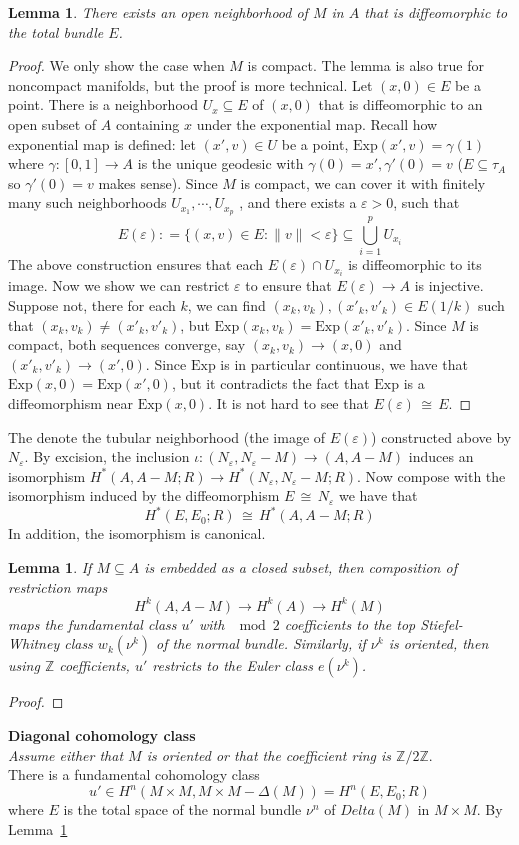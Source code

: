 \documentclass[12pt]{article}
\theoremstyle{plain}
\newtheorem{lemma}[equation]{Lemma}
\theoremstyle{definition}
\newcommand{\IZ}{\mathbb{Z}}
\newcommand\iso{\,{\cong}\,}
\newcommand\union{\bigcup}
\newcommand{\<}{\langle}
\renewcommand{\>}{\rangle}
\newcommand{\Exp}{\mathrm{Exp}}
\newcommand{\sm}{\varepsilon}
\begin{document}
\begin{lemma}
There exists an open neighborhood of $M$ in $A$ that is diffeomorphic to the total bundle $E$. 
\end{lemma}
\begin{proof}
We only show the case when $M$ is compact. The lemma is also true for noncompact manifolds, but the proof is more technical. Let $(x, 0) \in E$ be a point. There is a neighborhood $U_x \subseteq E$ of $(x, 0)$ that is diffeomorphic to an open subset of $A$ containing $x$ under the exponential map. Recall how exponential map is defined: let $(x', v) \in U$ be a point, $\Exp(x', v) = \gamma(1)$ where $\gamma : [0, 1] \to A$ is the unique geodesic with $\gamma(0) = x', \gamma'(0) = v$ ($E \subseteq \tau_A$ so $\gamma'(0) = v$ makes sense). Since $M$ is compact, we can cover it with finitely many such neighborhoods $U_{x_1}, \cdots, U_{x_p}$ , and there exists a $\sm >0 $, such that 
$$ E(\sm) : = \{(x, v) \in E : \| v\| < \sm \} \subseteq \union_{i = 1}^p U_{x_i}$$ 
The above construction ensures that each $E(\sm) \cap U_{x_i}$ is diffeomorphic to its image. Now we show we can restrict $\sm$ to ensure that $E(\sm) \to A$ is injective. Suppose not, there for each $k$, we can find $(x_k, v_k), (x'_k, v'_k) \in E(1/k)$ such that $(x_k, v_k) \neq (x'_k, v'_k)$, but $\Exp(x_k, v_k) = \Exp(x'_k, v'_k)$. Since $M$ is compact, both sequences converge, say $(x_k, v_k) \to (x, 0)$ and $(x'_k, v'_k) \to (x', 0)$. Since $\Exp$ is in particular continuous, we have that $\Exp(x, 0) = \Exp(x', 0)$, but it contradicts the fact that $\Exp$ is a diffeomorphism near $\Exp(x, 0)$. It is not hard to see that $E(\sm) \iso E$. 
\end{proof}
The denote the tubular neighborhood (the image of $E(\sm)$) constructed above by $N_\sm$. By excision, the inclusion $\iota : (N_\sm, N_\sm - M) \to (A, A - M)$ induces an isomorphism $H^*(A, A - M; R) \to H^*(N_\sm, N_\sm - M; R)$. Now compose with the isomorphism induced by the diffeomorphism $E \iso N_\sm$ we have that 
$$ H^*(E, E_0; R) \iso H^*(A, A - M; R) $$
In addition, the isomorphism is canonical.
\begin{lemma}
\label{normaltofund}
If $M \subseteq A$ is embedded as a closed subset, then composition of restriction maps 
$$ H^k(A, A - M) \to H^k(A) \to H^k(M)$$
maps the fundamental class $u'$ with $\mod 2$ coefficients to the top Stiefel-Whitney class $w_k(\nu^k)$ of the normal bundle. Similarly, if $\nu^k$ is oriented, then using $\IZ$ coefficients, $u'$ restricts to the Euler class $e(\nu^k)$. 
\end{lemma}
\begin{proof}

\end{proof}
\textbf{Diagonal cohomology class}\\
\textit{Assume either that $M$ is oriented or that the coefficient ring is $\IZ/2\IZ$}.\\
There is a fundamental cohomology class 
$$ u' \in H^n(M \times M, M \times M - \Delta(M)) = H^n(E, E_0; R)$$
where $E$ is the total space of the normal bundle $\nu^n$ of $Delta(M)$ in $M \times M$. By Lemma~\ref{normaltofund} 
\end{document}
